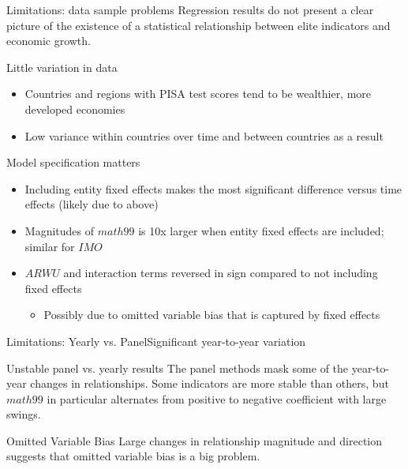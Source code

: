 \documentclass[10pt]{beamer}
\begin{document}
\begin{frame}{Limitations: data sample problems}
    Regression results do not present a clear picture of the existence of a statistical relationship between elite indicators and economic growth.
    \begin{block}{Little variation in data}
        \begin{itemize}
            \item Countries and regions with PISA test scores tend to be wealthier, more developed economies
            \item Low variance within countries over time and between countries as a result
        \end{itemize}
    \end{block}

    \begin{block}{Model specification matters}
        \begin{itemize}
            \item Including entity fixed effects makes the most significant difference versus time effects (likely due to above)
            \item Magnitudes of $math99$ is 10x larger when entity fixed effects are included; similar for $IMO$
            \item $ARWU$ and interaction terms reversed in sign compared to not including fixed effects
            \begin{itemize}
                \item Possibly due to omitted variable bias that is captured by fixed effects
            \end{itemize}
        \end{itemize}

    \end{block}
    
\end{frame}

\begin{frame}{Limitations: Yearly vs. Panel}{Significant year-to-year variation}
    \begin{block}{Unstable panel vs. yearly results}
        The panel methods mask some of the year-to-year changes in relationships.
        Some indicators are more stable than others, but $math99$ in particular alternates from positive to negative coefficient with large swings.
    \end{block}

    \begin{block}{Omitted Variable Bias}
        Large changes in relationship magnitude and direction suggests that omitted variable bias is a big problem.
    \end{block}
    
    
\end{frame}
\end{document}
